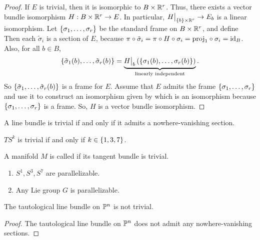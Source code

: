 \documentclass[main.tex]{subfiles}
\begin{document}
 \begin{proof}
    \impliespf If $E$ is trivial, then it is isomorphic to $B \times \mathbb{R}^r$. Thus, there exists a vector bundle isomorphism $H: B \times \mathbb{R}^r \to E$. In particular, $H\big|_{\left\{b\right\}\times \mathbb{R}^r} \to E_b$ is a linear isomorphism. Let $\left\{\sigma_1, \dots, \sigma_r\right\}$ be the standard frame on $B \times \mathbb{R}^r$, and define
    Then each $\tilde{\sigma}_i$ is a section of $E$, because $\pi \circ \tilde{\sigma}_i = \pi \circ H \circ \sigma_i = \text{proj}_1 \circ \sigma_i = \text{id}_{B}$. Also, for all $b \in B$, \[\left\{\tilde{\sigma}_1(b), \dots, \tilde{\sigma}_r(b)\right\} = \underbrace{H\big|_{b} \left( \left\{\sigma_1(b), \dots, \sigma_r(b)\right\} \right)}_{\text{linearly independent}}.\] So $\left\{\tilde{\sigma}_1, \dots, \tilde{\sigma}_r(b)\right\}$ is a frame for $E$. \impliedpf Assume that $E$ admits the frame $\left\{\sigma_1, \dots, \sigma_r\right\}$ and use it to construct an isomorphism given by
     which is an isomorphism because $\left\{\sigma_1, \dots, \sigma_r\right\}$ is a frame. So, $H$ is a vector bundle isomorphism.
 \end{proof}

 \begin{cor}
 A line bundle is trivial if and only if it admits a nowhere-vanishing section.
 \end{cor}

 \begin{cor}
 $TS^k$ is trivial if and only if $k \in \left\{1,3,7\right\}$.
 \end{cor}

\begin{defn}
 A manifold $M$ is called  if its tangent bundle is trivial.
\end{defn}

\begin{exmp}
    \begin{enumerate}
        \item $S^1, S^3, S^7$ are parallelizable.
        \item Any Lie group $G$ is parallelizable.
    \end{enumerate}
\end{exmp}

\begin{prop}
 The tautological line bundle on $\mathbb{P}^n$ is not trivial.
\end{prop}
\begin{proof}
The tautological line bundle on $\mathbb{P}^n$ does not admit any nowhere-vanishing sections.
\end{proof}


 
\end{document}
